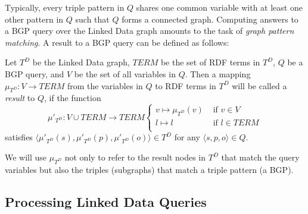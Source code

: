 Typically, every triple pattern in $Q$ shares one common variable with
at least one other pattern in $Q$ such that $Q$ forms a connected
graph. Computing answers to a BGP query over the Linked Data graph
amounts to the task of \emph{graph pattern matching}. A result to a
BGP query can be defined as follows:

\begin{definition}[Result]
  Let $T^D$ be the Linked Data graph, $TERM$ be the set of RDF terms
  in $T^D$, $Q$ be a BGP query, and $V$ be the set of all variables in
  $Q$. Then a mapping $\mu_{T^D}: V \to TERM$ from the variables in
  $Q$ to RDF terms in $T^D$ will be called a \emph{result} to $Q$, if
  the function
  \[
  \mu'_{T^D}: V \cup TERM \to TERM \left\{
    \begin{array}{ll}
      v \mapsto \mu_{T^D}(v) & \mbox{ if } v\in V \\
      l \mapsto l & \mbox{ if } l \in TERM\\
    \end{array}\right.
  \]
satisfies $\langle \mu'_{T^D}(s),\mu'_{T^D}(p), \mu'_{T^D}(o) \rangle
\in T^D$ for any $\langle s,p,o \rangle \in Q$.
\end{definition}

We will use $\mu_{T^D}$ not only to refer to
the result nodes in ${T^D}$ that match the query variables but also the
triples (subgraphs) that match a triple pattern (a BGP).


\subsection{Processing Linked Data Queries} 

